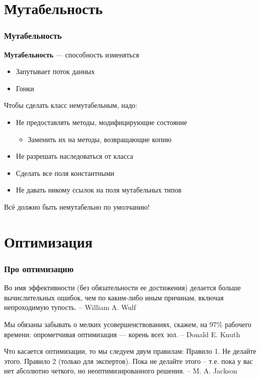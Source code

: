 \documentclass[xetex,mathserif,serif]{beamer}
\begin{document}
	\section{Мутабельность}

	\begin{frame}
		\frametitle{Мутабельность}
		\textbf{Мутабельность} --- способность изменяться
		\begin{itemize}
			\item Запутывает поток данных
			\item Гонки
		\end{itemize}
		\vspace{3mm}
		Чтобы сделать класс немутабельным, надо:
		\begin{itemize}
			\item Не предоставлять методы, модифицирующие состояние
			\begin{itemize}
				\item Заменить их на методы, возвращающие копию
			\end{itemize}
			\item Не разрешать наследоваться от класса
			\item Сделать все поля константными
			\item Не давать никому ссылок на поля мутабельных типов
		\end{itemize}
		Всё должно быть немутабельно по умолчанию!
	\end{frame}

	\section{Оптимизация}

	\begin{frame}
		\frametitle{Про оптимизацию}
		Во имя эффективности (без обязательности ее достижения) делается больше вычислительных ошибок, чем по каким-либо иным причинам, включая непроходимую тупость. \newline
		-- William A. Wulf 
	
		\vspace{3mm}
		Мы обязаны забывать о мелких усовершенствованиях, ска­жем, на 97\% рабочего времени: опрометчивая оптимизация --- корень всех зол. \newline
		-- Donald E. Knuth
	
		\vspace{3mm}
		Что касается оптимизации, то мы следуем двум правилам: \newline
		Правило 1. Не делайте этого.  \newline
		Правило 2 (только для экспертов). Пока не делайте этого -- т.е. пока у вас нет абсолютно четкого, но неоптимизированного решения. \newline
		-- M. A. Jackson
	\end{frame}
\end{document}
